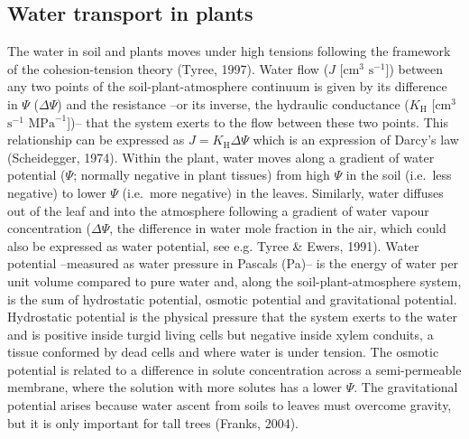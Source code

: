 \documentclass[11pt,twoside]{reedthesis}
\begin{document}
\subsection{Water transport in plants}\label{water-transport-in-plants}

The water in soil and plants moves under high tensions following the
framework of the cohesion-tension theory (Tyree, 1997). Water flow
(\(J\) {[}\(\text{cm}^3\) \(\text{s}^{-1}\){]}) between any two points
of the soil-plant-atmosphere continuum is given by its difference in
\(\Psi\) (\(\Delta\Psi\)) and the resistance --or its inverse, the
hydraulic conductance (\(K_{\text{H}}\) {[}\(\text{cm}^3\)
\(\text{s}^{-1}\) \(\text{MPa}^{-1}\){]})-- that the system exerts to
the flow between these two points. This relationship can be expressed as
\(J = K_\text{H}\Delta\Psi\) which is an expression of Darcy's law
(Scheidegger, 1974). Within the plant, water moves along a gradient of
water potential (\(\Psi\); normally negative in plant tissues) from high
\(\Psi\) in the soil (i.e.~less negative) to lower \(\Psi\) (i.e.~more
negative) in the leaves. Similarly, water diffuses out of the leaf and
into the atmosphere following a gradient of water vapour concentration
(\(\Delta\Psi\), the difference in water mole fraction in the air, which
could also be expressed as water potential, see e.g. Tyree \& Ewers,
1991). Water potential --measured as water pressure in Pascals (Pa)-- is
the energy of water per unit volume compared to pure water and, along
the soil-plant-atmosphere system, is the sum of hydrostatic potential,
osmotic potential and gravitational potential. Hydrostatic potential is
the physical pressure that the system exerts to the water and is
positive inside turgid living cells but negative inside xylem conduits,
a tissue conformed by dead cells and where water is under tension. The
osmotic potential is related to a difference in solute concentration
across a semi-permeable membrane, where the solution with more solutes
has a lower \(\Psi\). The gravitational potential arises because water
ascent from soils to leaves must overcome gravity, but it is only
important for tall trees (Franks, 2004).\par
\end{document}
